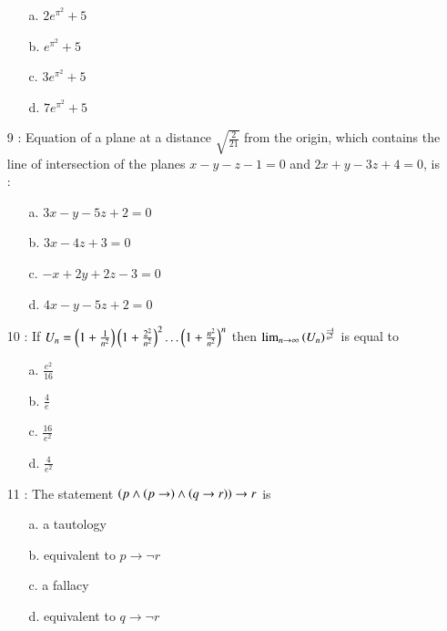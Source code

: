 \documentclass[journal]{IEEEtran}
\begin{document}
\begin{enumerate}
\begin{enumerate}
    \item [a.] $2e^{\pi ^2}+5$
    \item [b.] $e^{\pi ^2}+5$
    \item [c.] $3e^{\pi ^2}+5$
    \item [d.] $7e^{\pi ^2}+5$
\end{enumerate}
\item[9]: Equation of a plane at a distance $\sqrt{\frac{2}{21}}$ from the
origin, which contains the line of intersection of
the planes $x - y - z - 1 = 0$ and $2x + y - 3z + 4 = 0$,
is : 
\begin{enumerate}
     \item [a.] $3x-y-5z+2=0$
    \item [b.] $3x-4z+3=0$
    \item [c.] $-x+2y+2z-3=0$
    \item [d.] $4x-y-5z+2=0$
\end{enumerate}
\item[10]: If $U_n = \left(1+\frac{1}{n^2}\right)\left(1+\frac{2^2}{n^2}\right)^2\ldots\left(1+\frac{n^2}{n^2}\right)^n$ then $\lim_{n\rightarrow\infty}\left(U_n\right)^{\frac{-4}{n^2}}$ is equal to 
\begin{enumerate}
     \item [a.] $\frac{e^2}{16}$
    \item [b.] $\frac{4}{e}$
    \item [c.] $\frac{16}{e^2}$
    \item [d.] $\frac{4}{e^2}$
\end{enumerate}
\item[11]: The statement $\left(p\land\left(p\rightarrow\right)\land\left(q\rightarrow r\right)\right)\rightarrow r$ is
\begin{enumerate}
     \item [a.] a tautology
    \item [b.] equivalent to $p\rightarrow\neg r$
    \item [c.] a fallacy
    \item [d.] equivalent to $q\rightarrow\neg r$
\end{enumerate}


\end{enumerate}
\end{document}
